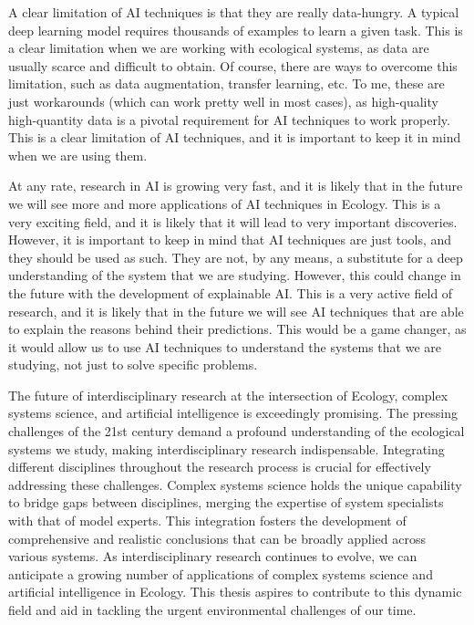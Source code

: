 A clear limitation of AI techniques is that they are really data-hungry. A
typical deep learning model requires thousands of examples to learn a given
task. This is a clear limitation when we are working with ecological systems,
as data are usually scarce and difficult to obtain. Of course, there are ways
to overcome this limitation, such as data augmentation, transfer learning, etc.
To me, these are just workarounds (which can work pretty well in most cases),
as high-quality high-quantity data is a pivotal requirement for AI techniques
to work properly. This is a clear limitation of AI techniques, and it is
important to keep it in mind when we are using them.

At any rate, research in AI is growing very fast, and it is likely that in the
future we will see more and more applications of AI techniques in Ecology. This
is a very exciting field, and it is likely that it will lead to very important
discoveries. However, it is important to keep in mind that AI techniques are
just tools, and they should be used as such. They are not, by any means, a
substitute for a deep understanding of the system that we are studying.
However, this could change in the future with the development of explainable
AI. This is a very active field of research, and it is likely that in the
future we will see AI techniques that are able to explain the reasons behind
their predictions. This would be a game changer, as it would allow us to use AI
techniques to understand the systems that we are studying, not just to solve
specific problems.

The future of interdisciplinary research at the intersection of Ecology,
complex systems science, and artificial intelligence is exceedingly promising.
The pressing challenges of the 21st century demand a profound understanding of
the ecological systems we study, making interdisciplinary research
indispensable. Integrating different disciplines throughout the research
process is crucial for effectively addressing these challenges. Complex systems
science holds the unique capability to bridge gaps between disciplines, merging
the expertise of system specialists with that of model experts. This
integration fosters the development of comprehensive and realistic conclusions
that can be broadly applied across various systems. As interdisciplinary
research continues to evolve, we can anticipate a growing number of
applications of complex systems science and artificial intelligence in Ecology.
This thesis aspires to contribute to this dynamic field and aid in tackling the
urgent environmental challenges of our time.
